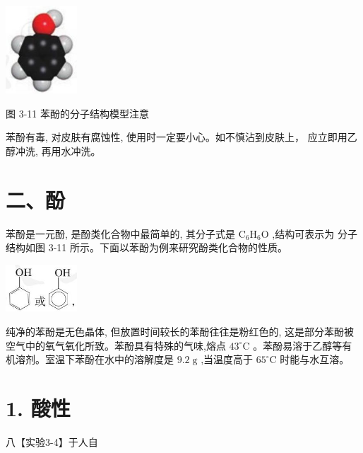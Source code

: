 \documentclass[10pt]{article}
\begin{document}
\begin{mdframed}

\begin{center}
\includegraphics[max width=0.2\textwidth]{images/0190efc5-b58a-7c43-bfb0-e0a030df9cfd_68_341323.jpg}
\end{center}

图 3-11 苯酚的分子结构模型注意

苯酚有毒, 对皮肤有腐蚀性, 使用时一定要小心。如不慎沾到皮肤上， 应立即用乙醇冲洗, 再用水冲洗。

\end{mdframed}

\section*{二、酚}

苯酚是一元酚, 是酚类化合物中最简单的, 其分子式是 \({\mathrm{C}}_{6}{\mathrm{H}}_{6}\mathrm{O}\) ,结构可表示为 分子结构如图 3-11 所示。下面以苯酚为例来研究酚类化合物的性质。

\begin{center}
\includegraphics[max width=0.2\textwidth]{images/0190efc5-b58a-7c43-bfb0-e0a030df9cfd_68_799998.jpg}
\end{center}

纯净的苯酚是无色晶体, 但放置时间较长的苯酚往往是粉红色的, 这是部分苯酚被空气中的氧气氧化所致。苯酚具有特殊的气味,熔点 \({43}^{ \circ }\mathrm{C}\) 。苯酚易溶于乙醇等有机溶剂。室温下苯酚在水中的溶解度是 \({9.2}\mathrm{\;g}\) ,当温度高于 \({65}^{ \circ }\mathrm{C}\) 时能与水互溶。

\section*{1. 酸性}

八【实验3-4】于人自

\begin{center}
\end{center}
\end{document}
